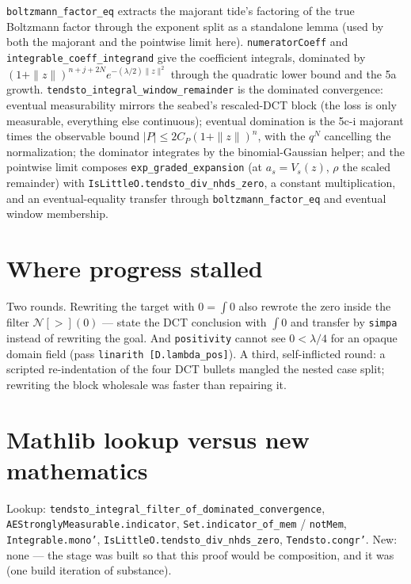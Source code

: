 \documentclass[11pt]{article}
\newcommand{\code}[1]{\texttt{#1}}
\begin{document}
\begin{sloppypar}
\code{boltzmann\_factor\_eq} extracts the majorant tide's factoring
of the true Boltzmann factor through the exponent split as a
standalone lemma (used by both the majorant and the pointwise limit
here). \code{numeratorCoeff} and
\code{integrable\_coeff\_integrand} give the coefficient integrals,
dominated by $(1+\|z\|)^{n+j+2N} e^{-(\lambda/2)\|z\|^2}$ through the
quadratic lower bound and the 5a growth.
\code{tendsto\_integral\_window\_remainder} is the dominated
convergence: eventual measurability mirrors the seabed's rescaled-DCT
block (the loss is only measurable, everything else continuous);
eventual domination is the 5c-i majorant times the observable bound
$|P| \le 2C_P(1+\|z\|)^n$, with the $q^N$ cancelling the
normalization; the dominator integrates by the binomial-Gaussian
helper; and the pointwise limit composes
\code{exp\_graded\_expansion} (at $a_s = V_s(z)$, $\rho$ the scaled
remainder) with \code{IsLittleO.tendsto\_div\_nhds\_zero}, a constant
multiplication, and an eventual-equality transfer through
\code{boltzmann\_factor\_eq} and eventual window membership.
\end{sloppypar}

\section{Where progress stalled}

Two rounds. Rewriting the target with $0 = \int 0$ also rewrote the
zero inside the filter $\mathcal N[>](0)$ --- state the DCT
conclusion with $\int 0$ and transfer by \code{simpa} instead of
rewriting the goal. And \code{positivity} cannot see
$0 < \lambda/4$ for an opaque domain field (pass
\code{linarith [D.lambda\_pos]}). A third, self-inflicted round: a
scripted re-indentation of the four DCT bullets mangled the nested
case split; rewriting the block wholesale was faster than repairing
it.

\section{Mathlib lookup versus new mathematics}

\begin{sloppypar}
Lookup: \code{tendsto\_integral\_filter\_of\_dominated\_convergence},
\code{AEStronglyMeasurable.indicator}, \code{Set.indicator\_of\_mem}
/ \code{notMem}, \code{Integrable.mono'},
\code{IsLittleO.tendsto\_div\_nhds\_zero},
\code{Tendsto.congr'}. New: none --- the stage was built so that
this proof would be composition, and it was (one build iteration of
substance).
\end{sloppypar}
\end{document}

